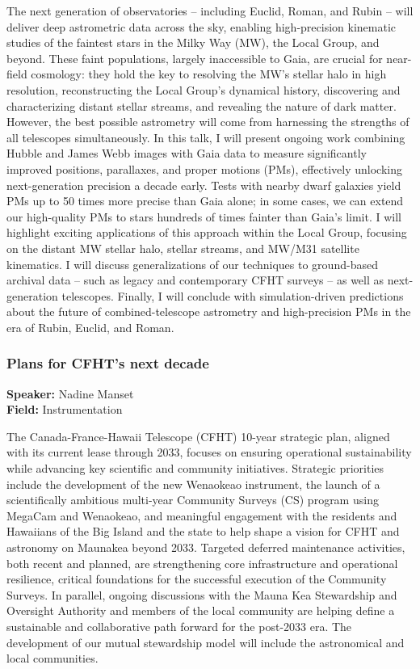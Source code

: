 The next generation of observatories -- including Euclid, Roman, and Rubin -- will deliver deep astrometric data across the sky, enabling high-precision kinematic studies of the faintest stars in the Milky Way (MW), the Local Group, and beyond. These faint populations, largely inaccessible to Gaia, are crucial for near-field cosmology: they hold the key to resolving the MW's stellar halo in high resolution, reconstructing the Local Group's dynamical history, discovering and characterizing distant stellar streams, and revealing the nature of dark matter. However, the best possible astrometry will come from harnessing the strengths of all telescopes simultaneously. In this talk, I will present ongoing work combining Hubble and James Webb images with Gaia data to measure significantly improved positions, parallaxes, and proper motions (PMs), effectively unlocking next-generation precision a decade early. Tests with nearby dwarf galaxies yield PMs up to 50 times more precise than Gaia alone; in some cases, we can extend our high-quality PMs to stars hundreds of times fainter than Gaia's limit. I will highlight exciting applications of this approach within the Local Group, focusing on the distant MW stellar halo, stellar streams, and MW/M31 satellite kinematics. I will discuss generalizations of our techniques to ground-based archival data -- such as legacy and contemporary CFHT surveys -- as well as next-generation telescopes. Finally, I will conclude with simulation-driven predictions about the future of combined-telescope astrometry and high-precision PMs in the era of Rubin, Euclid, and Roman.

\hypertarget{abstract-talk-157}{}\label{abstract-page-talk-157}
\subsubsection*{Plans for CFHT's next decade}
\textbf{Speaker:} Nadine Manset\\
\textbf{Field:} Instrumentation

The Canada-France-Hawaii Telescope (CFHT) 10-year strategic plan, aligned with its current lease through 2033, focuses on ensuring operational sustainability while advancing key scientific and community initiatives. Strategic priorities include the development of the new Wenaokeao instrument, the launch of a scientifically ambitious multi-year Community Surveys (CS) program using MegaCam and Wenaokeao, and meaningful engagement with the residents and Hawaiians of the Big Island and the state to help shape a vision for CFHT and astronomy on Maunakea beyond 2033. Targeted deferred maintenance activities, both recent and planned, are strengthening core infrastructure and operational resilience, critical foundations for the successful execution of the Community Surveys. In parallel, ongoing discussions with the Mauna Kea Stewardship and Oversight Authority and members of the local community are helping define a sustainable and collaborative path forward for the post-2033 era. The development of our mutual stewardship model will include the astronomical and local communities.

